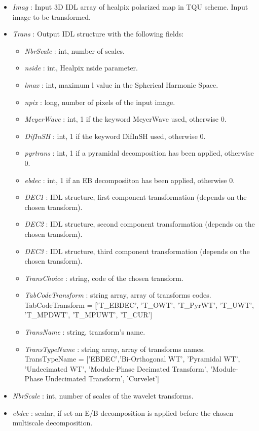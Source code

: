 \begin{itemize}
\item {\em Imag} : Input 3D IDL array of healpix polarized map in TQU scheme. Input image to be transformed.
\item {\em Trans} : Output IDL structure with the following fields:
\begin{itemize}
\item {\em NbrScale} : int, number of scales.
\item {\em nside} : int, Healpix nside parameter.
\item {\em lmax} : int, maximum l value in the Spherical Harmonic Space.
\item {\em npix} : long, number of pixels of the input image.
\item {\em MeyerWave} : int, 1 if the keyword MeyerWave used, otherwise 0.
\item {\em DifInSH} : int, 1 if the keyword DifInSH used, otherwise 0.
\item {\em pyrtrans} : int, 1 if a pyramidal decomposition has been applied, otherwise 0.
\item {\em ebdec} : int, 1 if an EB decomposiiton has been applied, otherwise 0.
\item {\em DEC1} : IDL structure, first component transformation (depends on the chosen transform).
\item {\em DEC2} : IDL structure, second component transformation (depends on the chosen transform).
\item {\em DEC3} : IDL structure, third component transformation (depends on the chosen transform).
\item {\em TransChoice} : string, code of the chosen transform.
\item {\em TabCodeTransform} : string array, array of transforms codes. TabCodeTransform = ['T\_EBDEC', 'T\_OWT', 'T\_PyrWT', 'T\_UWT', 'T\_MPDWT', 'T\_MPUWT', 'T\_CUR']
\item {\em TransName} : string, transform's name.
\item {\em TransTypeName} : string array, array of transforms names. 
TransTypeName = ['EBDEC','Bi-Orthogonal WT', 'Pyramidal WT', 'Undecimated WT', 'Module-Phase Decimated Transform', 'Module-Phase Undecimated Transform', 'Curvelet']
\end{itemize}
\item {\em NbrScale} : int, number of scales of the wavelet transforms.
\item {\em ebdec} : scalar, if set an E/B decomposition is applied before the chosen multiscale decomposition. 

\end{itemize}
